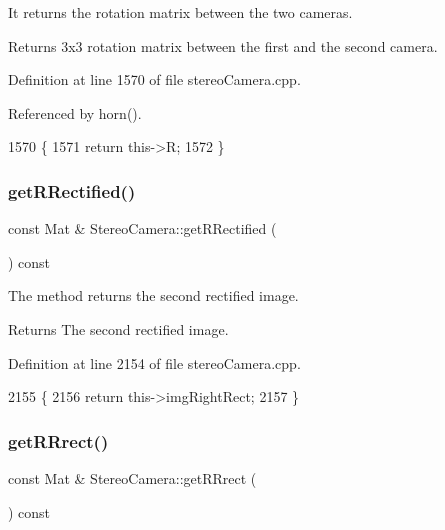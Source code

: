 It returns the rotation matrix between the two cameras. 

\begin{DoxyReturn}{Returns}
3x3 rotation matrix between the first and the second camera. 
\end{DoxyReturn}


Definition at line 1570 of file stereo\+Camera.\+cpp.



Referenced by horn().


\begin{DoxyCode}
1570                                            \{
1571     \textcolor{keywordflow}{return} this->R;
1572 \}
\end{DoxyCode}
\mbox{\label{classStereoCamera_aff19b07a766c01d04ed623a05ef4d67d}} 
\subsubsection{\texorpdfstring{get\+R\+Rectified()}{getRRectified()}}
{\footnotesize\ttfamily const Mat \& Stereo\+Camera\+::get\+R\+Rectified (\begin{DoxyParamCaption}{ }\end{DoxyParamCaption}) const}



The method returns the second rectified image. 

\begin{DoxyReturn}{Returns}
The second rectified image. 
\end{DoxyReturn}


Definition at line 2154 of file stereo\+Camera.\+cpp.


\begin{DoxyCode}
2155 \{
2156     \textcolor{keywordflow}{return} this->imgRightRect;
2157 \}
\end{DoxyCode}
\mbox{\label{classStereoCamera_a44e111911af89a299b134fd91b4bc7d6}} 
\subsubsection{\texorpdfstring{get\+R\+Rrect()}{getRRrect()}}
{\footnotesize\ttfamily const Mat \& Stereo\+Camera\+::get\+R\+Rrect (\begin{DoxyParamCaption}{ }\end{DoxyParamCaption}) const}



